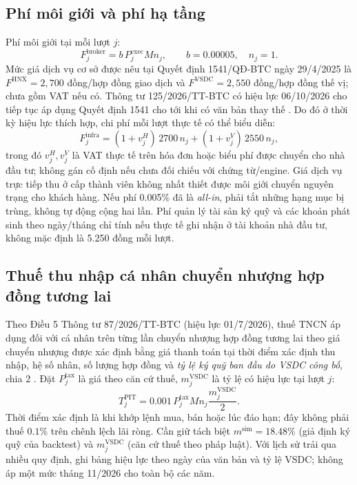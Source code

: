 \documentclass[12pt,a4paper,oneside]{article}
\begin{document}
\subsection{Phí môi giới và phí hạ tầng}
Phí môi giới tại mỗi lượt $j$:
\begin{equation}\label{eq:broker}
F_j^{\mathrm{broker}}=b\,P_j^{\mathrm{exec}}M n_j,
\qquad b=0.00005,\quad n_j=1.
\end{equation}
Mức giá dịch vụ cơ sở được nêu tại Quyết định 1541/QĐ-BTC ngày 29/4/2025 là $F^{\mathrm{HNX}}=2{,}700$ đồng/hợp đồng giao dịch và $F^{\mathrm{VSDC}}=2{,}550$ đồng/hợp đồng thế vị; chưa gồm VAT nếu có. Thông tư 125/2026/TT-BTC có hiệu lực 06/10/2026 cho tiếp tục áp dụng Quyết định 1541 cho tới khi có văn bản thay thế \cite{qd1541,tt125}. Do đó ở thời kỳ hiệu lực thích hợp, chi phí mỗi lượt thực tế có thể biểu diễn:
\begin{equation}\label{eq:infra}
F_j^{\mathrm{infra}}=
(1+v_j^{H})\,2700\,n_j+(1+v_j^{V})\,2550\,n_j,
\end{equation}
trong đó $v_j^H,v_j^V$ là VAT thực tế trên hóa đơn hoặc biểu phí được chuyển cho nhà đầu tư; không gán cố định nếu chưa đối chiếu với chứng từ/engine. Giá dịch vụ trực tiếp thu ở cấp thành viên không nhất thiết được môi giới chuyển nguyên trạng cho khách hàng. Nếu phí 0.005\% đã là \emph{all-in}, phải tắt những hạng mục bị trùng, không tự động cộng hai lần. Phí quản lý tài sản ký quỹ và các khoản phát sinh theo ngày/tháng chỉ tính nếu thực tế ghi nhận ở tài khoản nhà đầu tư, không mặc định là 5.250 đồng mỗi lượt.

\subsection{Thuế thu nhập cá nhân chuyển nhượng hợp đồng tương lai}\label{sec:tax}
Theo Điều 5 Thông tư 87/2026/TT-BTC (hiệu lực 01/7/2026), thuế TNCN áp dụng đối với cá nhân trên từng lần chuyển nhượng hợp đồng tương lai theo giá chuyển nhượng được xác định bằng giá thanh toán tại thời điểm xác định thu nhập, hệ số nhân, số lượng hợp đồng và \emph{tỷ lệ ký quỹ ban đầu do VSDC công bố}, chia 2 \cite{tt87,govtax}. Đặt $P_j^{\mathrm{tax}}$ là giá theo căn cứ thuế, $m_j^{\mathrm{VSDC}}$ là tỷ lệ có hiệu lực tại lượt $j$:
\begin{equation}\label{eq:tax}
\boxed{T_j^{\mathrm{PIT}}=0.001\,P_j^{\mathrm{tax}}M n_j\frac{m_j^{\mathrm{VSDC}}}{2}.}
\end{equation}
Thời điểm xác định là khi khớp lệnh mua, bán hoặc lúc đáo hạn; đây không phải thuế $0.1\%$ trên chênh lệch lãi ròng. Cần giữ tách biệt $m^{\mathrm{sim}}=18.48\%$ (giả định ký quỹ của backtest) và $m_j^{\mathrm{VSDC}}$ (căn cứ thuế theo pháp luật). Với lịch sử trải qua nhiều quy định, ghi bảng hiệu lực theo ngày của văn bản và tỷ lệ VSDC; không áp một mức tháng 11/2026 cho toàn bộ các năm.
\end{document}
